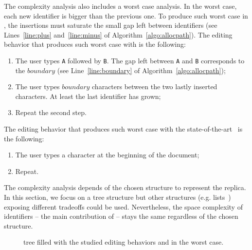 \noindent The complexity analysis also includes a worst case analysis. In the
worst case, each new identifier is bigger than the previous one. To produce such
worst case in \LSEQ, the insertions must saturate the small gap left between
identifiers (see Lines~\ref{line:plus} and~\ref{line:minus} of
Algorithm~\ref{algo:allocpath}). The editing behavior that produces such worst
case with \LSEQ is the following:
\begin{enumerate}[noitemsep]
\item The user types \texttt{A} followed by \texttt{B}. The gap left between
  \texttt{A} and \texttt{B} corresponds to the $boundary$ (see
  Line~\ref{line:boundary} of Algorithm~\ref{algo:allocpath});
\item The user types $boundary$ characters between the two lastly inserted
  characters. At least the last identifier has grown;
\item Repeat the second step.
\end{enumerate}
The editing behavior that produces such worst case with the
state-of-the-art~\cite{preguica2009commutative, weiss2009logoot} is the
following:
\begin{enumerate}[noitemsep]
\item The user types a character at the beginning of the document;
\item Repeat.
\end{enumerate}



The complexity analysis depends of the chosen structure to represent the
replica. In this section, we focus on a tree structure but other structures
(e.g. lists~\cite{weiss2009logoot}) exposing different tradeoffs could be
used. Nevertheless, the space complexity of identifiers -- the main contribution
of \LSEQ -- stays the same regardless of the chosen structure.

\begin{figure}
  \centering
  \hspace{5pt}
  \hspace{5pt}
  \caption{\label{fig:complexity} \LSEQ tree filled with the studied editing
    behaviors and in the worst case.}
\end{figure}


